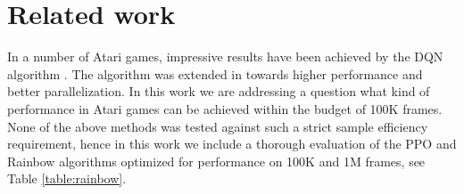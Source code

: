 \section{Related work}
\label{sec:related_work}


In a number of Atari games, impressive results have been achieved by the DQN algorithm \cite{dqn}. The algorithm was extended in \cite{ppo,acktr,dqn2,rainbow,a3c} towards higher performance and better parallelization.
In this work we are addressing a question what kind of performance in Atari games can be achieved within the budget of 100K frames. None of the above methods was tested against such a strict sample efficiency requirement, hence in this work we include a thorough evaluation of the PPO \cite{ppo} and Rainbow \cite{rainbow} algorithms optimized for performance on 100K and 1M frames, see Table \ref{table:rainbow}.

